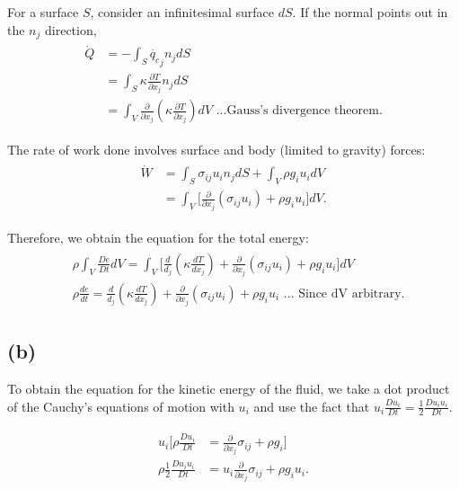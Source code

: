 \documentclass{article}
\begin{document}
For a surface $S$, consider an infinitesimal surface $dS$. If the normal points out in the $n_{j}$ direction,
\begin{align}\label{eq:dotQ}
 \begin{split}
  \dot{Q} & = -\int_{S}\dot{q_{c}}_{j} n_{j} dS \\
  & = \int_{S}  \kappa \frac{\partial T}{\partial x_{j}} n_{j} dS \\
  & = \int_{V} \frac{\partial}{\partial x_{j}}\left( \kappa \frac{\partial T}{\partial x_{j}} \right) dV \textrm{ ...Gauss's divergence theorem}.
 \end{split}
\end{align}

The rate of work done involves surface and body (limited to gravity) forces:
\begin{align}\label{eq:dotW}
 \begin{split}
  \dot{W} & = \int_{S} \sigma_{ij} u_{i} n_{j} dS + \int_{V} \rho g_{i} u_{i} dV \\
 & = \int_{V} \bigg[\frac{\partial}{\partial x_{j}}(\sigma_{ij} u_{i}) + \rho g_{i} u_{i}\bigg] dV.
 \end{split}
\end{align}

Therefore, we obtain the equation for the total energy:
\begin{align} \label{eq:etotal}
 \begin{split}
    & \rho \int_{V} \frac{De}{Dt} dV =   \int_{V} \bigg[\frac{d}{d_{j}}\left( \kappa \frac{dT}{dx_{j}} \right) + \frac{\partial}{\partial x_{j}}(\sigma_{ij} u_{i}) + \rho g_{i} u_{i} \bigg] dV\\
    & \boxed{\rho \frac{de}{dt} = \frac{d}{d_{j}}\left( \kappa \frac{dT}{dx_{j}} \right) + \frac{\partial}{\partial x_{j}}(\sigma_{ij} u_{i}) + \rho g_{i} u_{i} } \textrm{ ... Since dV arbitrary.}
 \end{split}
\end{align}

\subsection*{(b)}

To obtain the equation for the kinetic energy of the fluid, we take a dot product of the Cauchy's equations of motion with $u_{i}$ and use the fact that $u_{i} \frac{Du_{i}}{Dt} = \frac{1}{2} \frac{D u_{i}u_{i}}{Dt}.$

\begin{align}\label{eq:ke}
 \begin{split}
    u_{i} \bigg [\rho \frac{Du_{i}}{Dt} &= \frac{\partial}{\partial x_{j}} \sigma_{ij} + \rho g_{i} \bigg]\\
    \rho\frac{1}{2}\frac{D u_{i}u_{i}}{Dt} & = u_{i}\frac{\partial}{\partial x_{j}} \sigma_{ij} + \rho g_{i} u_{i}.
 \end{split}
\end{align}
\end{document}
